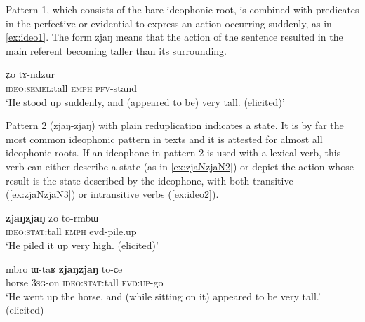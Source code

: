 \documentclass[oldfontcommands,oneside,a4paper,11pt]{article}
\newcommand{\ipa}[1]{{\phon \mbox{#1}}} %
\begin{document}
Pattern 1, which consists of the bare ideophonic root, is combined with predicates in the perfective or evidential to express an action occurring suddenly, as in \ref{ex:ideo1}. The form \ipa{zjaŋ} means that the action of the sentence resulted in the main referent becoming taller than its surrounding.

\begin{exe} 
\ex \label{ex:ideo1}
\gll \ipa{\textbf{zjaŋ}} \ipa{ʑo} 	\ipa{tɤ-ndzur}  \\
\textsc{ideo:semel}:tall \textsc{emph} \textsc{pfv}-stand \\
\glt `He stood up suddenly, and (appeared to be) very tall.  (elicited)'
\end{exe}
 
Pattern 2 (\ipa{zjaŋ-zjaŋ}) with plain reduplication  indicates a state. It is by far the most common ideophonic pattern in texts and it is attested for almost all ideophonic roots.  If an ideophone in pattern 2 is used with a lexical verb, this verb can either describe a state (as in \ref{ex:zjaNzjaN2}) or depict the action whose result is the state described by the ideophone, with both transitive (\ref{ex:zjaNzjaN3}) or intransitive verbs (\ref{ex:ideo2}).

 
 
  \begin{exe} 
\ex  \label{ex:zjaNzjaN3}
\gll 
\ipa{\textbf{zjaŋzjaŋ}}  \ipa{ʑo} \ipa{to-rmbɯ} \\
 \textsc{ideo:stat}:tall \textsc{emph} evd-pile.up \\
 \glt `He piled it up very high. (elicited)'
  \end{exe}
 \begin{exe} 
\ex  \label{ex:ideo2}
\gll 
\ipa{mbro}  	\ipa{ɯ-taʁ}  	\ipa{\textbf{zjaŋzjaŋ}}  	\ipa{to-ɕe}  \\
horse \textsc{3sg}-on \textsc{ideo:stat}:tall  \textsc{evd:up}-go \\
\glt `He went up the horse, and (while sitting on it) appeared to be very tall.'    (elicited)
 \end{exe}
 
\end{document}
